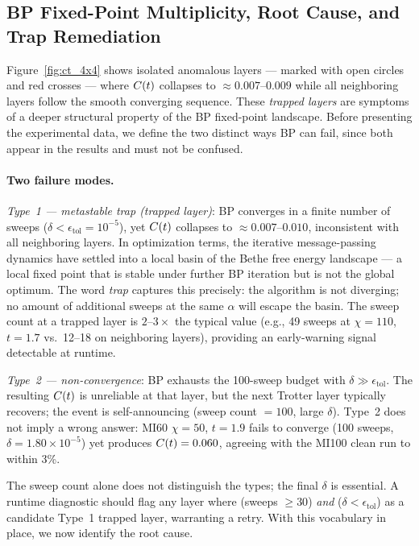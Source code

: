 \subsection{BP Fixed-Point Multiplicity, Root Cause, and Trap Remediation}
\label{sec:bp_convergence}

Figure~\ref{fig:ct_4x4} shows isolated anomalous layers --- marked with open circles
and red crosses --- where $C(t)$ collapses to $\approx 0.007$--$0.009$ while all
neighboring layers follow the smooth converging sequence.
These \emph{trapped layers} are symptoms of a deeper structural property of the
BP fixed-point landscape.
Before presenting the experimental data, we define the two distinct ways BP can
fail, since both appear in the results and must not be confused.

\paragraph{Two failure modes.}
\emph{Type~1 --- metastable trap (trapped layer)}: BP converges in a finite
number of sweeps ($\delta < \epsilon_{\mathrm{tol}} = 10^{-5}$), yet $C(t)$
collapses to $\approx 0.007$--$0.010$, inconsistent with all neighboring layers.
In optimization terms, the iterative message-passing dynamics have settled into
a local basin of the Bethe free energy landscape --- a local fixed point that is
stable under further BP iteration but is not the global optimum.
The word \emph{trap} captures this precisely: the algorithm is not diverging;
no amount of additional sweeps at the same $\alpha$ will escape the basin.
The sweep count at a trapped layer is $2$--$3\times$ the typical value
(e.g., 49 sweeps at $\chi=110$, $t=1.7$ vs.\ 12--18 on neighboring layers),
providing an early-warning signal detectable at runtime.

\emph{Type~2 --- non-convergence}: BP exhausts the 100-sweep budget with
$\delta \gg \epsilon_{\mathrm{tol}}$.
The resulting $C(t)$ is unreliable at that layer, but the next Trotter layer
typically recovers; the event is self-announcing (sweep count $= 100$, large
$\delta$).
Type~2 does not imply a wrong answer: MI60 $\chi=50$, $t=1.9$ fails to
converge (100 sweeps, $\delta = 1.80\times10^{-5}$) yet produces $C(t) = 0.060$,
agreeing with the MI100 clean run to within 3\%.

The sweep count alone does not distinguish the types; the final $\delta$ is
essential.
A runtime diagnostic should flag any layer where (sweeps $\geq 30$) \emph{and}
($\delta < \epsilon_{\mathrm{tol}}$) as a candidate Type~1 trapped layer,
warranting a retry.
With this vocabulary in place, we now identify the root cause.

